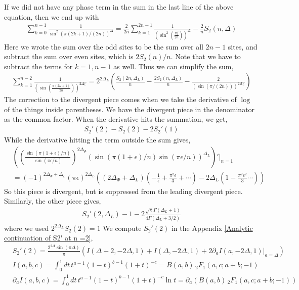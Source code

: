 \documentclass[11pt]{article}
\newcommand{\ep}{\epsilon}
\newcommand{\p}{\partial}
\newcommand{\lb}{\left(}
\newcommand{\rb}{\right)}
\begin{document}
If we did not have any phase term in the sum in the last line of the above equation, then we end up with
\begin{align}
    \sum_{k=0}^{n-1} \frac{1}{\sin^2 \lb \pi (2k+1) / (2n)\rb^{\Delta}}= \frac{2}{2n}\sum_{k=1}^{2n-1} \frac{1}{\lb \sin^2\lb \frac{\pi j }{2n}\rb \rb^{\Delta}} -\frac{2}{n}S_2(n,\Delta)
\end{align}
Here we wrote the sum over the odd sites to be the sum over all $2n-1$ sites, and subtract the sum over even sites, which is $2S_2(n)/n$. Note that we have to subtract the terms for $k=1,n-1$ as well. 
Thus we can simplify the sum,
\begin{align}
    \sum_{k=1}^{n-2} \frac{1}{\lb \sin\lb \frac{ \pi(2k+1)}{2n}\rb\rb^{2\Delta_L } } = 2^{2\Delta_L}\lb \frac{S_2(2n,\Delta_L)}{n} - \frac{2S_2(n,\Delta_L)}{n} - \frac{2}{\lb \sin(\pi/(2n))\rb^{2\Delta_L}}\rb 
\end{align} 
The correction to the divergent piece comes when we take the derivative of $\log$ of the things inside parentheses. 
We have the divergent piece in the denominator as the common factor. When the derivative hits the summation, we get,
\begin{align}
    S_2'(2) -S_2(2) - 2S_2'(1) 
\end{align}
While the derivative hitting the term outside the sum gives,
\begin{align}
  &  \lb \lb\frac{ \sin \lb \pi (1+\ep)/n\rb }{ \sin (\pi \ep / n)}\rb^{2\Delta_\Phi}(\sin (\pi (1+\ep)/n)\sin (\pi \ep/n))^{ \Delta_L}\rb'\Bigg|_{n=1} \\&= (-1)^{2\Delta_\Phi+\Delta_L}(\pi \ep)^{2\Delta_L} \lb (2\Delta_\Phi + \Delta_L) \lb -\frac{1}{\ep} + \frac{\pi^2 \ep}{3} + \cdots \rb  - 2\Delta_L\lb 1-\frac{\pi^2 \ep^2}{3} \cdots\rb\rb
\end{align}
So this piece is divergent, but is suppressed from the leading divergent piece. Similarly, the other piece gives,
\begin{align}
     S_2'(2,\Delta_L) -1 -2\frac{\sqrt{\pi } \Gamma(\Delta_L + 1)}{4\Gamma (\Delta_L + 3/2)} 
\end{align}
where we used $2^{2\Delta_L}S_2(2) = 1$
We compute $S_2'(2)$ in the Appendix \ref{Analytic continuation of S2' at n =2},
\begin{align}
    &S_2'(2) = \frac{2^{2\Delta}\sin(\pi \Delta)}{\pi} \lb I(\Delta +2,-2\Delta,1) + I(\Delta ,-2\Delta,1) +2\p_aI(a,-2\Delta,1)|_{a=\Delta} \rb\\
    & I (a,b,c) = \int_0^1 dt \, t^{a-1}(1-t)^{b-1} (1+t)^{-c} = B(a,b) \,_2F_1(a,c;a+b;-1) \\
    & \p_a I (a,b,c) = \int_0^1 dt \, t^{a-1}(1-t)^{b-1} (1+t)^{-c} \ln t = \p_a \lb B(a,b) \,_2F_1(a,c;a+b;-1)\rb 
\end{align}
\end{document}
